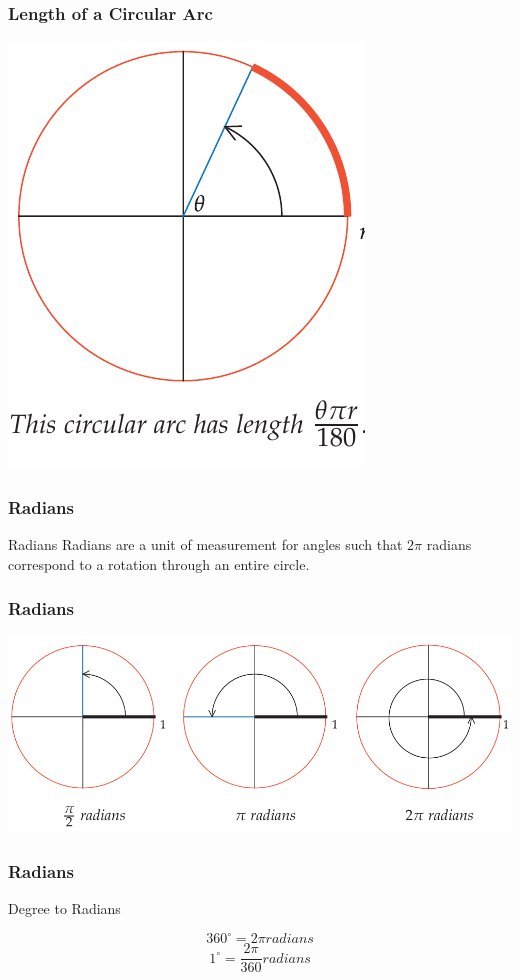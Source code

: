 \documentclass{beamer}
\begin{document}
\begin{frame}
    \frametitle{Length of a Circular Arc}
    \centering
    \includegraphics[scale=0.5]{5.png}
\end{frame}

\begin{frame}
    \frametitle{Radians}
   \begin{block}{Radians}
    Radians are a unit of measurement for angles such that $2\pi$ radians correspond
    to a rotation through an entire circle.
   \end{block}
\end{frame}

\begin{frame}
    \frametitle{Radians}
    \centering
    \includegraphics[scale=0.3]{6.png}
\end{frame}
\begin{frame}
    \frametitle{Radians}
   \begin{block}{Degree to Radians}

    $$ 360^{\circ} = 2 \pi radians $$
    $$ 1 ^{\circ}  = \frac{2 \pi}{360} radians $$
    
   \end{block}
\end{frame}
\end{document}
